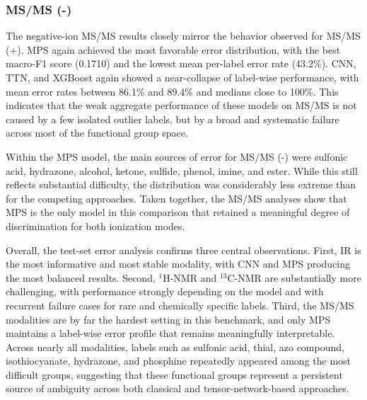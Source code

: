 \subsubsection{MS/MS (-)}

The negative-ion MS/MS results closely mirror the behavior observed for MS/MS
(+). MPS again achieved the most favorable error distribution, with the best
macro-F1 score (0.1710) and the lowest mean per-label error rate (43.2\%).
CNN, TTN, and XGBoost again showed a near-collapse of label-wise performance,
with mean error rates between 86.1\% and 89.4\% and medians close to 100\%.
This indicates that the weak aggregate performance of these models on MS/MS is
not caused by a few isolated outlier labels, but by a broad and systematic
failure across most of the functional group space.

Within the MPS model, the main sources of error for MS/MS (-) were sulfonic
acid, hydrazone, alcohol, ketone, sulfide, phenol, imine, and ester. While this
still reflects substantial difficulty, the distribution was considerably less
extreme than for the competing approaches. Taken together, the MS/MS analyses
show that MPS is the only model in this comparison that retained a meaningful
degree of discrimination for both ionization modes.

Overall, the test-set error analysis confirms three central observations. First,
IR is the most informative and most stable modality, with CNN and MPS producing
the most balanced results. Second, $^1$H-NMR and $^{13}$C-NMR are substantially
more challenging, with performance strongly depending on the model and with
recurrent failure cases for rare and chemically specific labels. Third, the
MS/MS modalities are by far the hardest setting in this benchmark, and only MPS
maintains a label-wise error profile that remains meaningfully interpretable.
Across nearly all modalities, labels such as sulfonic acid, thial, azo
compound, isothiocyanate, hydrazone, and phosphine repeatedly appeared among the
most difficult groups, suggesting that these functional groups represent a
persistent source of ambiguity across both classical and tensor-network-based
approaches.
